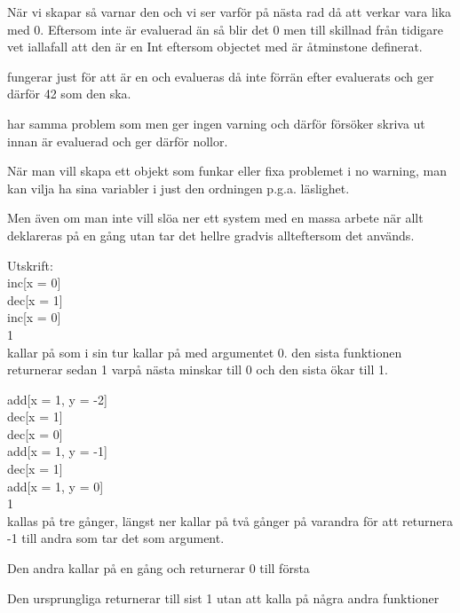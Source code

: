 När vi skapar  så varnar den och vi ser varför på nästa rad då att  verkar vara lika med 0. Eftersom  inte är evaluerad än så blir det 0 men till skillnad från tidigare vet  iallafall att den är en Int eftersom objectet med  är åtminstone definerat.

 fungerar just för att  är en  och evalueras då inte förrän efter  evaluerats och ger därför 42 som den ska.

 har samma problem som  men ger ingen varning och därför försöker skriva ut innan  är evaluerad och ger därför nollor.

\Subtask 
När man vill skapa ett objekt som funkar eller fixa problemet i no warning, man kan vilja ha sina variabler i just den ordningen p.g.a. läslighet.

Men även om man inte vill slöa ner ett system med en massa arbete när allt deklareras på en gång utan tar det hellre gradvis allteftersom det används. 

\Task

\Subtask
Utskrift: \\
inc[x = 0]\\
dec[x = 1]\\
inc[x = 0]\\
1\\ 

 kallar på  som i sin tur kallar på  med argumentet 0. den sista funktionen returnerar sedan 1 varpå nästa minskar till 0 och den sista ökar till 1.

add[x = 1, y = -2]\\
dec[x = 1]\\
dec[x = 0]\\
add[x = 1, y = -1]\\
dec[x = 1]\\
add[x = 1, y = 0]\\
1\\

 kallas på tre gånger,  längst ner kallar på  två gånger på varandra för att returnera -1 till andra  som tar det som argument.

Den andra  kallar på  en gång och returnerar 0 till första 

Den ursprungliga  returnerar till sist 1 utan att kalla på några andra funktioner
  
